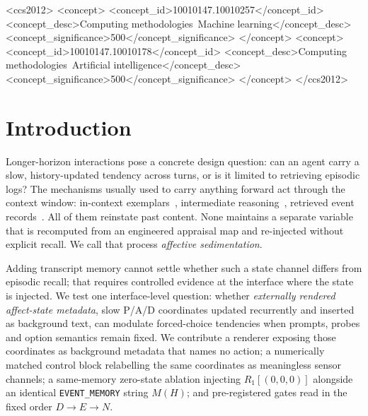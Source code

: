 \documentclass[sigconf]{acmart}
\begin{document}
\begin{CCSXML}
<ccs2012>
 <concept>
  <concept_id>10010147.10010257</concept_id>
  <concept_desc>Computing methodologies~Machine learning</concept_desc>
  <concept_significance>500</concept_significance>
 </concept>
 <concept>
  <concept_id>10010147.10010178</concept_id>
  <concept_desc>Computing methodologies~Artificial intelligence</concept_desc>
  <concept_significance>500</concept_significance>
 </concept>
</ccs2012>
\end{CCSXML}



\maketitle

\section{Introduction}

Longer-horizon interactions pose a concrete design question: can an agent carry a slow, history-updated tendency across turns, or is it limited to retrieving episodic logs? The mechanisms usually used to carry anything forward act through the context window: in-context exemplars~\cite{brown2020language}, intermediate reasoning~\cite{wei2022chain}, retrieved event records~\cite{park2023generative}. All of them reinstate past content. None maintains a separate variable that is recomputed from an engineered appraisal map and re-injected without explicit recall. We call that process \emph{affective sedimentation}.

Adding transcript memory cannot settle whether such a state channel differs from episodic recall; that requires controlled evidence at the interface where the state is injected. We test one interface-level question: whether \emph{externally rendered affect-state metadata}, slow P/A/D coordinates updated recurrently and inserted as background text, can modulate forced-choice tendencies when prompts, probes and option semantics remain fixed. We contribute a renderer exposing those coordinates as background metadata that names no action; a numerically matched control block relabelling the same coordinates as meaningless sensor channels; a same-memory zero-state ablation injecting $R_1[(0,0,0)]$ alongside an identical \texttt{EVENT\_MEMORY} string $M(H)$; and pre-registered gates read in the fixed order $D\rightarrow E\rightarrow N$.
\end{document}
